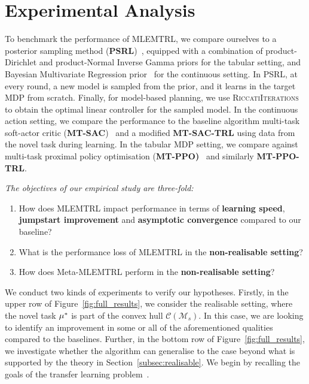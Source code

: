 \section{Experimental Analysis}\label{sec:experiments}

To benchmark the performance of MLEMTRL, we compare ourselves to a posterior sampling method (\textbf{PSRL})~\citep{osband2013more}, equipped with a combination of product-Dirichlet and product-Normal Inverse Gamma priors for the tabular setting, and Bayesian Multivariate Regression prior~\citep{minka2000bayesian} for the continuous setting. In PSRL, at every round, a new model is sampled from the prior, and it learns in the target MDP from scratch. Finally, for model-based planning, we use \textsc{RiccatiIterations} to obtain the optimal linear controller for the sampled model. In the continuous action setting, we compare the performance to the baseline algorithm multi-task soft-actor critic (\textbf{MT-SAC})~\citep{haarnoja2018soft, yu2020meta} and a modified \textbf{MT-SAC-TRL} using data from the novel task during learning. In the tabular MDP setting, we compare against multi-task proximal policy optimisation (\textbf{MT-PPO)}~\citep{schulman2017proximal, yu2020meta} and similarly \textbf{MT-PPO-TRL}.%

\textit{The objectives of our empirical study are three-fold:}%
\begin{enumerate}
    \item How does \textsc{MLEMTRL} impact performance in terms of \textbf{learning speed}, \textbf{jumpstart improvement} and \textbf{asymptotic convergence} compared to our baseline?
    \item What is the performance loss of \textsc{MLEMTRL} in the \textbf{non-realisable setting}?
    \item How does Meta-MLEMTRL perform in the \textbf{non-realisable setting}?
\end{enumerate}

We conduct two kinds of experiments to verify our hypotheses. Firstly, in the upper row of Figure~\ref{fig:full_results}, we consider the realisable setting, where the novel task $\mu^*$ is part of the convex hull $\mathcal{C}(\mathcal{M}_s)$. In this case, we are looking to identify an improvement in some or all of the aforementioned qualities compared to the baselines.
Further, in the bottom row of Figure~\ref{fig:full_results}, we investigate whether the algorithm can generalise to the case beyond what is supported by the theory in Section~\ref{subsec:realisable}. We begin by recalling the goals of the transfer learning problem~\citep{langley2006transfer}.%


